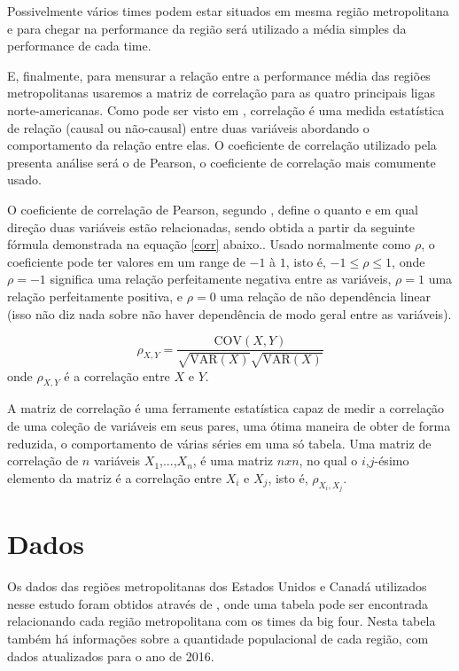 \documentclass[12pt,oneside,a4paper,chapter=TITLE,english,brazil,sumario=abnt-6027-2012]{abntex2}
\begin{document}
	Possivelmente vários times podem estar situados em mesma região metropolitana e para chegar na performance da região será utilizado a média simples da performance de cada time.
	
	E, finalmente, para mensurar a relação entre a performance média das regiões metropolitanas usaremos a matriz de correlação para as quatro principais ligas norte-americanas. Como pode ser visto em , correlação é uma medida estatística de relação (causal ou não-causal) entre duas variáveis abordando o comportamento da relação entre elas. O coeficiente de correlação utilizado pela presenta análise será o de Pearson, o coeficiente de correlação mais comumente usado. 
	
	O coeficiente de correlação de Pearson, segundo , define o quanto e em qual direção duas variáveis estão relacionadas, sendo obtida a partir da seguinte fórmula demonstrada na equação \ref{corr} abaixo.. Usado normalmente como $\rho$, o coeficiente pode ter valores em um range de $-1$ à $1$, isto é, $-1 \leq \rho \leq 1$, onde $\rho =-1$ significa uma relação perfeitamente negativa entre as variáveis, $\rho=1$ uma relação perfeitamente positiva, e $\rho=0$ uma relação de não dependência linear (isso não diz nada sobre não haver dependência de modo geral entre as variáveis).
	
	\begin{equation}
		\rho_{X,Y} = \frac{\mbox{COV}(X,Y)}{\sqrt{\mbox{VAR}(X)}\sqrt{\mbox{VAR}(X)}}
		\label{corr}
	\end{equation}
	onde $\rho_{X,Y}$ é a correlação entre $X$ e $Y$.
	
	A matriz de correlação é uma ferramente estatística capaz de medir a correlação de uma coleção de variáveis em seus pares, uma ótima maneira de obter de forma reduzida, o comportamento de várias séries em uma só tabela. Uma matriz de correlação de $n$ variáveis $X_1$,...,$X_n$, é uma matriz $nxn$, no qual o $i$,$j$-ésimo elemento da matriz é a correlação entre $X_i$ e $X_j$, isto é, $\rho_{X_i,X_j}$.
	
	
\chapter{Dados}

	Os dados das regiões metropolitanas dos Estados Unidos e Canadá utilizados nesse estudo foram obtidos através de , onde uma tabela pode ser encontrada relacionando cada região metropolitana com os times da big four. Nesta tabela também há informações sobre a quantidade populacional de cada região, com dados atualizados para o ano de 2016.
	
\end{document}
